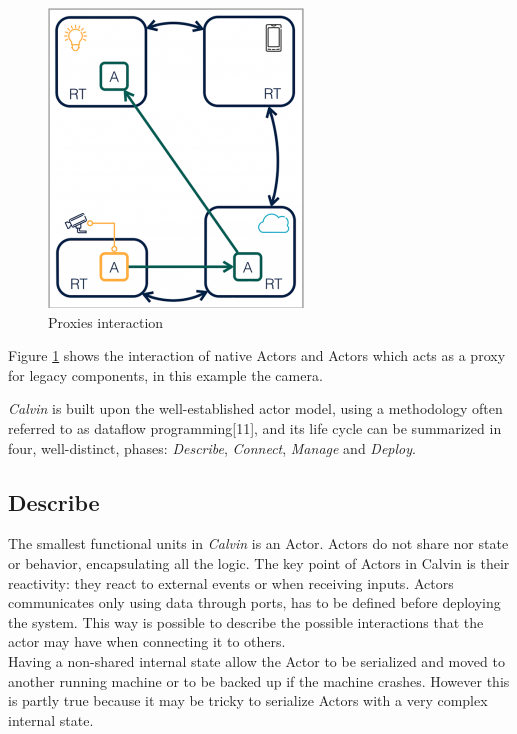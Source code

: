         \begin{figure}[h]
        \caption{Proxies interaction}
        \label{fig:calvinproxy}
        \centering
        \includegraphics[scale=0.75]{calvin4.png}
        \end{figure}
  Figure \ref{fig:calvinproxy} shows the interaction of native Actors and Actors which
  acts as a proxy for legacy components, in this example the camera.




  \textit{Calvin} is built upon the well-established actor model, using a methodology often referred to as dataflow programming[11], and
  its life cycle can be summarized in four, well-distinct, phases: \textit{Describe}, \textit{Connect}, \textit{Manage}
  and \textit{Deploy}.

\subsection{Describe}
  The smallest functional units in \textit{Calvin} is an Actor. Actors do not share
  nor state or behavior, encapsulating all the logic. The key point of Actors in Calvin
  is their reactivity: they react to external events or when receiving inputs. Actors
  communicates only using data through ports, has to be defined before deploying the system.
  This way is possible to describe the possible interactions that the actor may have when
  connecting it to others.\\
  Having a non-shared internal state allow the Actor to be serialized and moved to another
  running machine or to be backed up if the machine crashes. However this is partly true because
  it may be tricky to serialize Actors with a very complex internal state.

